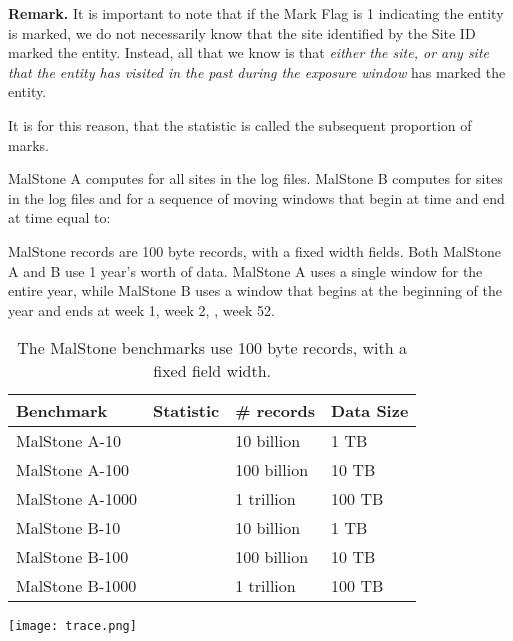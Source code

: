 \documentclass{acm_proc_article-sp}
\def\spm{\mbox{SPM}}
\def\malstone{MalStone } \def\malgen{MalGen }
\begin{document}
\medbreak
{\bf Remark.}  
It is important to note that if the Mark Flag is 1 indicating the entity is marked, we do not necessarily
know that the site identified by the Site ID marked the entity.  Instead, all that
we know is that {\em either the site, or any site that the entity has visited in the past
during the exposure window} has marked the entity.   

It is for this reason, that the statistic is called the subsequent proportion of marks.

\malstone A computes  for all sites  in the log files.  \malstone B computes
 for sites  in the log files and for a sequence of moving windows 
that begin at time  and end at time  equal to:


MalStone records are 100 byte records, with a fixed width fields.
Both \malstone A and B use 1 year's worth of data.  \malstone A uses a
single window for the entire year, while \malstone B uses a window that
begins at the beginning of the year and ends at week 1, week 2, ,
week 52.


\begin{table}
\begin{tabular}{|l|l|l|l|} \hline
{\bf Benchmark} & {\bf Statistic} & {\bf \#  records} & {\bf Data Size} \\ \hline
MalStone A-10 &  & 10 billion & 1 TB \\ \hline
MalStone A-100 &  & 100 billion & 10 TB \\ \hline
MalStone A-1000 &  & 1 trillion & 100 TB \\ \hline
MalStone B-10 &  & 10 billion & 1 TB \\ \hline
MalStone B-100 &  & 100 billion & 10 TB \\ \hline
MalStone B-1000 &  & 1 trillion & 100 TB \\ \hline
\end{tabular}
\caption{The MalStone benchmarks use 100 byte records, with a fixed
field width. }
\label{malstone-table}
\end{table}


\begin{figure*}
\centering
\texttt{[image: trace.png]}
\caption{The diagram shows an example of how the \spm\ statistic
is computed.   Here sites  are represented by small
  rectangles and marked sites are represented by shaded
  rectangles.  Specifically, for each site  at time ,
  \malstone B collects all the transactions (represented by arrows)
  that are associated with the site at time  or earlier. Notice
  there are no transactions associated with  at time , but
  that there are two transactions associated with the site at earlier
  times  and .  Entity  was associated with the
  site at  and entity  at time .  Entity 
  became marked at the site  at time  (represented
  by red entity arrow with an ``X''). Therefore  of the
  transactions are marked for site  with respect to the
  window .}
\label{figure:example}
\end{figure*}
\end{document}
